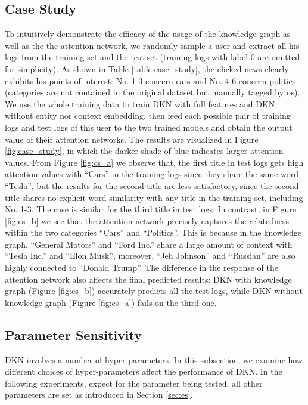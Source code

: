\documentclass[sigconf]{acmart}
\begin{document}
	\subsection{Case Study}
	\label{sec:cs}        	
        	To intuitively demonstrate the efficacy of the usage of the knowledge graph as well as the the attention network, we randomly sample a user and extract all his logs from the training set and the test set (training logs with label 0 are omitted for simplicity).
        	As shown in Table \ref{table:case_study}, the clicked news clearly exhibits his points of interest: No. 1-3 concern cars and No. 4-6 concern politics (categories are not contained in the original dataset but manually tagged by us).
        	We use the whole training data to train DKN with full features and DKN without entity nor context embedding, then feed each possible pair of training logs and test logs of this user to the two trained models and obtain the output value of their attention networks.
        	The results are visualized in Figure \ref{fig:case_study}, in which the darker shade of blue indicates larger attention values.
        	From Figure \ref{fig:cs_a} we observe that, the first title in test logs gets high attention values with ``\textsf{Cars}'' in the training logs since they share the same word ``\textsf{Tesla}'', but the results for the second title are less satisfactory, since the second title shares no explicit word-similarity with any title in the training set, including No. 1-3.
        	The case is similar for the third title in test logs.
        	In contrast, in Figure \ref{fig:cs_b} we see that the attention network precisely captures the relatedness within the two categories ``\textsf{Cars}'' and ``\textsf{Politics}''.
        	This is because in the knowledge graph, ``\textsf{General Motors}'' and ``\textsf{Ford Inc.}'' share a large amount of context with ``\textsf{Tesla Inc.}'' and ``\textsf{Elon Musk}'', moreover, ``\textsf{Jeh Johnson}'' and ``\textsf{Russian}'' are also highly connected to ``\textsf{Donald Trump}''.
        	The difference in the response of the attention network also affects the final predicted results: DKN with knowledge graph (Figure \ref{fig:cs_b}) accurately predicts all the test logs, while DKN without knowledge graph (Figure \ref{fig:cs_a}) fails on the third one.
		
		
	
	\subsection{Parameter Sensitivity}
	\label{sec:ps}		
		DKN involves a number of hyper-parameters.
		In this subsection, we examine how different choices of hyper-parameters affect the performance of DKN.
		In the following experiments, expect for the parameter being tested, all other parameters are set as introduced in Section \ref{sec:es}.
		
\end{document}
